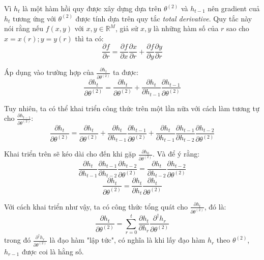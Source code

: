 Vì $h_t$ là một hàm hồi quy được xây dựng dựa trên $\theta^{(2)}$ và $h_{t-1}$ nên gradient cuả $h_t$ tương ứng với $\theta^{(2)}$ được tính dựa trên quy tắc \textit{total derivative}. Quy tắc này nói rằng nếu $f(x,y)$ với $x, y \in \mathbb{R}^M$, giả sử $x,y$ là những hàm số của $r$ sao cho $x = x(r); y = y(r)$ thì ta có:
\begin{equation} \label{gradientWRTSt6}
	\frac{\partial{f}}{\partial{r}} = \frac{\partial f}{\partial x}\frac{\partial x }{\partial r} + \frac{\partial f }{\partial y }\frac{\partial y }{\partial r }
\end{equation}

Áp dụng vào trường hợp của $\frac{\partial h_t}{\partial \theta^{(2)} }$ ta được:
\begin{equation} \label{gradientWRTSt7}
	\frac{\partial h_t}{ \partial \theta^{(2)}} = \frac{\partial h_t}{ \partial \theta^{(2)}} + \frac{\partial h_t }{\partial h_{t-1} } \frac{\partial h_{t-1}}{ \partial \theta^{(2)}}
\end{equation}

Tuy nhiên, ta có thể khai triển công thức trên một lần nữa với cách làm tương tự cho $\frac{\partial h_{t-1}}{\partial \theta^{(2)} }$:
\begin{equation} \label{gradientWRTSt8}
	\frac{\partial h_t}{\partial \theta^{(2)}} = \frac{\partial h_t}{\partial \theta^{(2)}} + \frac{\partial h_t }{\partial h_{t-1}} \frac{\partial h_{t-1}}{\partial \theta^{(2)}} + \frac{\partial h_t}{\partial h_{t-1}} \frac{\partial h_{t-1}}{\partial h_{t-2}} \frac{\partial h_{t-2}}{\partial \theta^{(2)}}
\end{equation}

Khai triển trên sẽ kéo dài cho đến khi gặp $\frac{\partial h_0}{\partial \theta^{(2)}}$. Và để ý rằng:
\begin{equation} \label{gradientWRTSt9}
	\frac{\partial h_t}{\partial h_{t-1}} \frac{\partial h_{t-1}}{\partial h_{t-2}} \frac{\partial h_{t-2}}{\partial \theta^{(2)}} = \frac{\partial h_t}{\partial h_{t-2}}\frac{\partial h_{t-2}}{\partial \theta^{(2)}}
\end{equation}
\begin{equation} \label{gradientWRTSt10}
	\frac{\partial h_{t}}{\partial \theta^{(2)}} = \frac{\partial h_{t}}{\partial h_t} \frac{\partial h_t}{\partial \theta^{(2)}}
\end{equation}

Với cách khai triển như vậy, ta có công thức tổng quát cho $\frac{\partial h_t}{\partial \theta^{(2)}}$, đó là:
\begin{equation} \label{gradientWRTSt11}
	\frac{\partial h_t}{\partial \theta^{(2)}} = \sum_{r=0}^{t} \frac{\partial h_{t}}{\partial h_r} \frac{\partial^{\dagger} h_r}{\partial \theta^{(2)}}
\end{equation}
trong đó $\frac{\partial^{\dagger} h_r}{\partial \theta^{(2)}}$ là đạo hàm "lập tức", có nghĩa là khi lấy đạo hàm $h_r$ theo $\theta^{(2)}$, $h_{r-1}$ được coi là hằng số.

